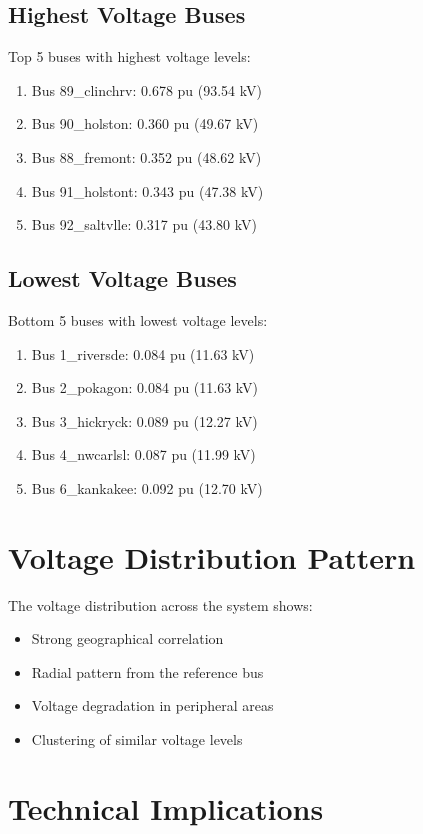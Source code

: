 \documentclass[11pt]{article}
\begin{document}
\subsection{Highest Voltage Buses}
Top 5 buses with highest voltage levels:
\begin{enumerate}
    \item Bus 89\_clinchrv: 0.678 pu (93.54 kV)
    \item Bus 90\_holston: 0.360 pu (49.67 kV)
    \item Bus 88\_fremont: 0.352 pu (48.62 kV)
    \item Bus 91\_holstont: 0.343 pu (47.38 kV)
    \item Bus 92\_saltvlle: 0.317 pu (43.80 kV)
\end{enumerate}

\subsection{Lowest Voltage Buses}
Bottom 5 buses with lowest voltage levels:
\begin{enumerate}
    \item Bus 1\_riversde: 0.084 pu (11.63 kV)
    \item Bus 2\_pokagon: 0.084 pu (11.63 kV)
    \item Bus 3\_hickryck: 0.089 pu (12.27 kV)
    \item Bus 4\_nwcarlsl: 0.087 pu (11.99 kV)
    \item Bus 6\_kankakee: 0.092 pu (12.70 kV)
\end{enumerate}

\section{Voltage Distribution Pattern}
The voltage distribution across the system shows:
\begin{itemize}
    \item Strong geographical correlation
    \item Radial pattern from the reference bus
    \item Voltage degradation in peripheral areas
    \item Clustering of similar voltage levels
\end{itemize}

\section{Technical Implications}
\end{document}
